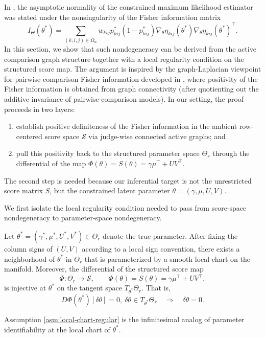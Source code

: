 \documentclass{article}
\begin{document}
\begin{bibunit}[unsrtnat]
In , the asymptotic normality of the constrained maximum likelihood estimator was stated under the nonsingularity of the Fisher information matrix
\[
I_{\Theta}(\theta^*)
=
\sum_{(k,i,j)\in\Omega_w}
w_{kij} p_{kij}^*(1-p_{kij}^*)
\nabla_\theta \eta_{kij}(\theta^*)
\nabla_\theta \eta_{kij}(\theta^*)^\top.
\]
In this section, we show that such nondegeneracy can be derived from the active comparison
graph structure together with a local regularity condition on the structured score map.
The argument is inspired by the graph-Laplacian viewpoint for pairwise-comparison Fisher
information developed in \cite{han2025statisticalinferencepairwisecomparison}, where positivity of the Fisher information is obtained from graph connectivity (after quotienting out the additive invariance of pairwise-comparison
models). In our setting, the proof proceeds in two layers:
\begin{enumerate}
    \item establish positive definiteness of the Fisher information in the ambient row-centered score space \(\mathcal S\) via judge-wise connected active graphs; and
    \item pull this positivity back to the structured parameter space \(\Theta_r\) through the differential of the map \(\Phi(\theta)=S(\theta)=\gamma\mu^\top + UV^\top\).
\end{enumerate}
The second step is needed because our inferential target is not the unrestricted score matrix
\(S\), but the constrained latent parameter \(\theta=(\gamma,\mu,U,V)\).

We first isolate the local regularity condition needed to pass from score-space
nondegeneracy to parameter-space nondegeneracy.

\begin{assumption}
\label{asm:local-chart-regular}
Let \(\theta^*=(\gamma^*,\mu^*,U^*,V^*)\in\Theta_r\) denote the true parameter.
After fixing the column signs of \((U,V)\) according to a local sign convention, there exists a neighborhood of \(\theta^*\) in \(\Theta_r\) that is parameterized by a smooth local chart on the manifold. Moreover, the differential of the structured score map
\[\Phi:\Theta_r \to \mathcal S,
\qquad
\Phi(\theta)=S(\theta)=\gamma\mu^\top + UV^\top,
\]
is injective at \(\theta^*\) on the tangent space \(T_{\theta^*}\Theta_r\). That is,
\[D\Phi(\theta^*)[\delta\theta]=0,\ \delta\theta\in T_{\theta^*}\Theta_r
\quad\Longrightarrow\quad\delta\theta=0.
\]
\end{assumption}
Assumption \ref{asm:local-chart-regular} is the infinitesimal analog of parameter identifiability at the local chart of $\theta^*$.
\end{bibunit}
\end{document}
